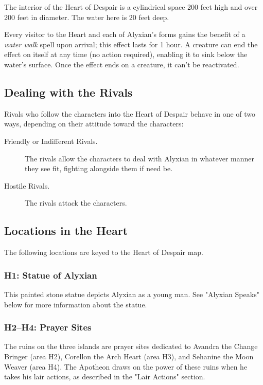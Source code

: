 \documentclass[letterpaper, 11pt, bg=full, twocolumn]{dndbook}
\begin{document}
The interior of the Heart of Despair is a cylindrical space 200 feet high and over 200 feet in diameter. The water here is 20 feet deep.

Every visitor to the Heart and each of Alyxian's forms gains the benefit of a \textit{water walk} spell upon arrival; this effect lasts for 1 hour. A creature can end the effect on itself at any time (no action required), enabling it to sink below the water's surface. Once the effect ends on a creature, it can't be reactivated.

\subsection{Dealing with the Rivals}

Rivals who follow the characters into the Heart of Despair behave in one of two ways, depending on their attitude toward the characters:

\begin{description}
\item[Friendly or Indifferent Rivals.] The rivals allow the characters to deal with Alyxian in whatever manner they see fit, fighting alongside them if need be.
\item[Hostile Rivals.] The rivals attack the characters.
\end{description}

\subsection{Locations in the Heart}

The following locations are keyed to the Heart of Despair map.



\subsubsection{H1: Statue of Alyxian}

This painted stone statue depicts Alyxian as a young man. See "Alyxian Speaks" below for more information about the statue.

\subsubsection{H2--H4: Prayer Sites}

The ruins on the three islands are prayer sites dedicated to Avandra the Change Bringer (area H2), Corellon the Arch Heart (area H3), and Sehanine the Moon Weaver (area H4). The Apotheon draws on the power of these ruins when he takes his lair actions, as described in the "Lair Actions" section.
\end{document}
